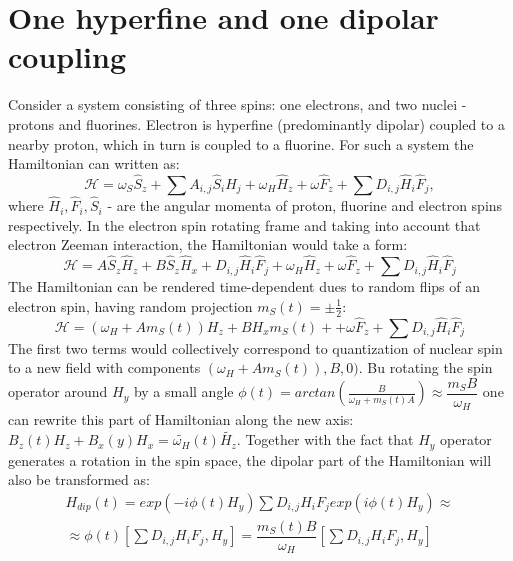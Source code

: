 \documentclass[a4paper, 12pt]{article}
\begin{document}
\section{One hyperfine and one dipolar coupling}
Consider a system consisting of three spins: one electrons, and two nuclei - protons and fluorines. Electron is hyperfine (predominantly dipolar) coupled to a nearby proton, which in turn is coupled to a fluorine. For such a system the Hamiltonian can written as: 
\begin{equation}
\mathcal{H} =  \omega_S \hat{S}_z + \sum A_{i,j} \hat{S}_i \hat{H}_j + \omega_H \hat{H}_z + \omega \hat{F}_z + \sum D_{i,j} \hat{H}_i \hat{F}_j,
\end{equation}
where $\hat{H}_i, \hat{F}_i, \hat{S}_i$ - are the angular momenta of proton, fluorine and electron spins respectively. In the electron spin rotating frame and taking into account that electron Zeeman interaction, the Hamiltonian would take a form:
\begin{equation}
  \mathcal{H}  = A \hat{S}_z \hat{H}_z + B \hat{S}_z \hat{H}_x + D_{i,j} \hat{H}_i \hat{F}_j +  \omega_H \hat{H}_z + \omega \hat{F}_z + \sum D_{i,j} \hat{H}_i \hat{F}_j
\end{equation}
The Hamiltonian can be rendered time-dependent dues to random flips of an electron spin, having random projection $m_S(t) = \pm \frac{1}{2}$:
\begin{equation}
\mathcal{H} = (\omega_H + A m_S(t)) H_z + B H_x m_S(t) + + \omega \hat{F}_z + \sum D_{i,j} \hat{H}_i \hat{F}_j
\end{equation}
The first two terms would collectively correspond to quantization of nuclear spin to a new field  with components $(\omega_H + A m_S(t)), B, 0)$. Bu rotating the spin operator around $H_y$ by a small angle $\phi(t)= arctan(\frac{B}{\omega_H + m_S(t) A} )  \approx \dfrac{m_S B}{\omega_H}$ one can rewrite this part of Hamiltonian along the new axis: $B_z(t) H_z + B_x(y) H_x = \tilde{\omega_H}(t) \tilde{H_z}$. Together with the fact that $H_y$ operator generates a rotation in the spin space, the dipolar part of the Hamiltonian will also be transformed as:
\begin{equation}
\begin{array}{cc}
H_{dip} (t) =  exp(-i \phi(t) H_y) \sum D_{i,j} H_i F_j exp(i \phi(t) H_y)  \approx  \\
\approx \phi(t)[ \sum D_{i,j} H_i F_j, H_y] = \dfrac{m_S(t) B}{\omega_H} [ \sum D_{i,j} H_i F_j, H_y]
\end{array}
\end{equation}
\end{document}
